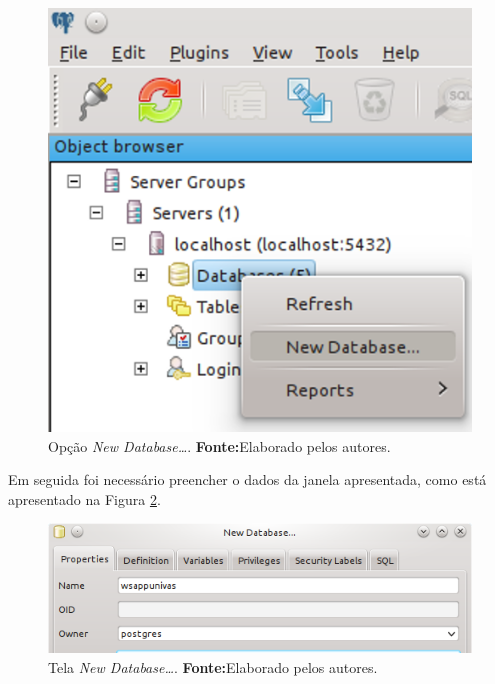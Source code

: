 	\begin{figure}[h!]
		\centerline{\includegraphics[scale=0.5]{./imagens/2_q_metodologico/4_procedimentos_resultados/43_webservice/432_desenvolvimento/desws1.png}}
		\caption[Opção New Database]{Opção \textit{New Database\ldots}.
			\textbf{Fonte:}Elaborado pelos autores.}
		\label{fig:desws1}
	\end{figure}

	\pagebreak
	
	\par Em seguida foi necessário preencher o dados da janela apresentada, como
está apresentado na Figura \ref{fig:desws2}.
	
	\begin{figure}[h!]
		\centerline{\includegraphics[scale=0.7]{./imagens/2_q_metodologico/4_procedimentos_resultados/43_webservice/432_desenvolvimento/desws2.png}}
		\caption[Tela New Database]{Tela \textit{New Database\ldots}.
			\textbf{Fonte:}Elaborado pelos autores.}
		\label{fig:desws2}
	\end{figure}

